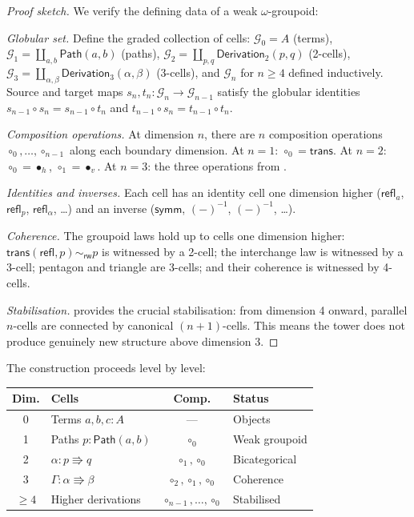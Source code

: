 \documentclass[manuscript]{BSLstyle}
\newcommand{\Path}{\mathsf{Path}}
\newcommand{\refl}{\mathsf{refl}}
\newcommand{\symm}{\mathsf{symm}}
\newcommand{\trans}{\mathsf{trans}}
\newcommand{\rweq}{\sim_{\mathsf{rw}}}
\begin{document}
\begin{proof}[Proof sketch]
We verify the defining data of a weak $\omega$-groupoid:

\emph{Globular set.}  Define the graded collection of cells:
$\mathcal{G}_0 = A$ (terms), $\mathcal{G}_1 = \coprod_{a,b} \Path(a,b)$
(paths), $\mathcal{G}_2 = \coprod_{p,q} \mathsf{Derivation}_2(p,q)$
(2-cells), $\mathcal{G}_3 = \coprod_{\alpha,\beta} \mathsf{Derivation}_3(\alpha,\beta)$
(3-cells), and $\mathcal{G}_n$ for $n \geq 4$ defined inductively.
Source and target maps $s_n, t_n : \mathcal{G}_n \to \mathcal{G}_{n-1}$
satisfy the globular identities $s_{n-1} \circ s_n = s_{n-1} \circ t_n$
and $t_{n-1} \circ s_n = t_{n-1} \circ t_n$.

\emph{Composition operations.}  At dimension $n$, there are $n$
composition operations $\circ_0, \ldots, \circ_{n-1}$ along each
boundary dimension.  At $n = 1$: $\circ_0 = \trans$.
At $n = 2$: $\circ_0 = \bullet_h$, $\circ_1 = \bullet_v$.
At $n = 3$: the three operations from .

\emph{Identities and inverses.}  Each cell has an identity cell one
dimension higher ($\refl_a$, $\refl_p$, $\refl_\alpha$, \ldots) and
an inverse ($\symm$, $(-)^{-1}$, $(-)^{-1}$, \ldots).

\emph{Coherence.}  The groupoid laws hold up to cells one dimension
higher: $\trans(\refl, p) \rweq p$ is witnessed by a 2-cell;
the interchange law is witnessed by a 3-cell; pentagon and triangle
are 3-cells; and their coherence is witnessed by 4-cells.

\emph{Stabilisation.}   provides the crucial
stabilisation: from dimension 4 onward, parallel $n$-cells are connected
by canonical $(n+1)$-cells.  This means the tower does not produce
genuinely new structure above dimension 3.
\end{proof}

The construction proceeds level by level:
\begin{center}
\small
\begin{tabular}{clcp{4.5cm}}
\toprule
\textbf{Dim.} & \textbf{Cells} & \textbf{Comp.} & \textbf{Status} \\
\midrule
0 & Terms $a, b, c : A$ & --- & Objects \\
1 & Paths $p : \Path(a,b)$ & $\circ_0$ & Weak groupoid \\
2 & $\alpha : p \Rrightarrow q$ & $\circ_1, \circ_0$ & Bicategorical \\
3 & $\Gamma : \alpha \Rrightarrow \beta$ & $\circ_2, \circ_1, \circ_0$ & Coherence \\
$\ge 4$ & Higher derivations & $\circ_{n-1}, \ldots, \circ_0$ & Stabilised \\
\bottomrule
\end{tabular}
\end{center}
\end{document}
